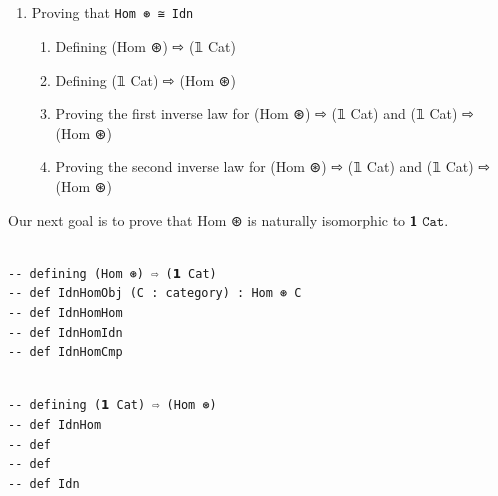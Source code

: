 \documentclass{book}
\newcounter{lcounter}
\newcounter{sectioncount}
\newcounter{subsectioncount}
\renewcommand{\section}[1]{\newpage
\ \\
\ \\
 \begin{center} \scalebox{1.5}{\texttt{\thesectioncount . #1}} \setcounter{sectioncount}{\thesectioncount+1} \setcounter{subsectioncount}{1} \end{center}
 \begin{center}

\ \\
\ \\

\thispagestyle{empty}
\end{center}
}
\begin{document}
\section{\texttt{Hom ⊛ ≅ 𝟭 Cat}} %

\begin{enumerate}
\item Proving that \texttt{Hom ⊛ ≅ Idn}
\begin{enumerate}
\item Defining (Hom ⊛) ⇨ (𝟙 Cat)
\item Defining (𝟙 Cat) ⇨ (Hom ⊛)
\item Proving the first inverse law for (Hom ⊛) ⇨ (𝟙 Cat) and (𝟙 Cat) ⇨ (Hom ⊛)
\item Proving the second inverse law for (Hom ⊛) ⇨ (𝟙 Cat) and (𝟙 Cat) ⇨ (Hom ⊛)
\end{enumerate}
\end{enumerate}

Our next goal is to prove that Hom ⊛ is naturally isomorphic to $\texttt{𝟭 Cat}$. 

\begin{center}
\begin{tcolorbox}[width=5in,colback={white},title={\begin{center}\texttt{Lean \thelcounter} \addtocounter{lcounter}{1}  \end{center}},colbacktitle=Blue,coltitle=black]
\begin{verbatim}

-- defining (Hom ⊛) ⇨ (𝟭 Cat)
-- def IdnHomObj (C : category) : Hom ⊛ C 
-- def IdnHomHom 
-- def IdnHomIdn
-- def IdnHomCmp

\end{verbatim}%
\end{tcolorbox}
\end{center}


\begin{center}
\begin{tcolorbox}[width=5in,colback={white},title={\begin{center}\texttt{Lean \thelcounter} \addtocounter{lcounter}{1}  \end{center}},colbacktitle=Blue,coltitle=black]
\begin{verbatim}

-- defining (𝟭 Cat) ⇨ (Hom ⊛)
-- def IdnHom
-- def 
-- def 
-- def Idn

\end{verbatim}%
\end{tcolorbox}
\end{center}
\end{document}
